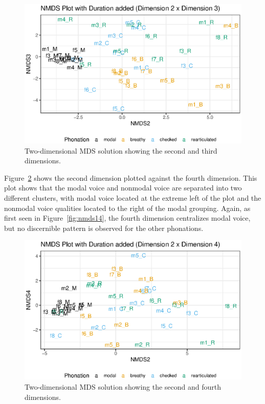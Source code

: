\begin{figure}[!h]
    \centering
    \includegraphics[width = 0.9\linewidth]{images/MDS/nmds23_dur.eps}
    \caption{Two-dimensional MDS solution showing the second and third dimensions.}
    \label{fig:nmds23}
\end{figure}

Figure~\ref{fig:nmds24} shows the second dimension plotted against the fourth dimension. This plot shows that the modal voice and nonmodal voice are separated into two different clusters, with modal voice located at the extreme left of the plot and the nonmodal voice qualities located to the right of the modal grouping. Again, as first seen in Figure~\ref{fig:nmds14}, the fourth dimension centralizes modal voice, but no discernible pattern is observed for the other phonations.

\begin{figure}[!h]
    \centering
    \includegraphics[width = \linewidth]{images/MDS/nmds24_dur.eps}
    \caption{Two-dimensional MDS solution showing the second and fourth dimensions.}
    \label{fig:nmds24}
\end{figure}

